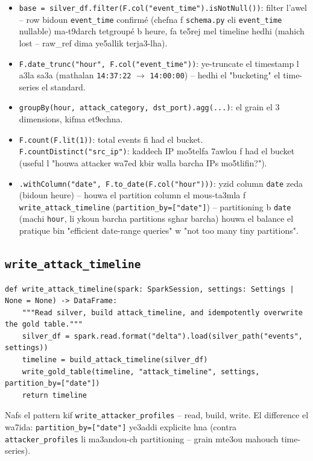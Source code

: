 \documentclass[11pt,a4paper]{report}
\DeclareRobustCommand{\code}[1]{\texttt{#1}}
\begin{document}
\begin{itemize}
  \item \code{base = silver\_df.filter(F.col("event\_time").isNotNull())}:
        filter l'awel -- row bidoun \code{event\_time} confirmé (chefna
        f \code{schema.py} eli \code{event\_time} nullable) ma-t9darch
        tetgroupé b heure, fa te5rej mel timeline hedhi (mahich lost --
        raw\_ref dima ye5allik terja3-lha).
  \item \code{F.date\_trunc("hour", F.col("event\_time"))}: ye-truncate
        el timestamp l a3la sa3a (mathalan \code{14:37:22} $\to$
        \code{14:00:00}) -- hedhi el "bucketing" el time-series el standard.
  \item \code{groupBy(hour, attack\_category, dst\_port).agg(...)}: el
        grain el 3 dimensions, kifma et9echna.
  \item \code{F.count(F.lit(1))}: total events fi had el bucket.
        \code{F.countDistinct("src\_ip")}: kaddech IP mo5telfa 7awlou
        f had el bucket (useful l "houwa attacker wa7ed kbir walla
        barcha IPs mo5tlifin?").
  \item \code{.withColumn("date", F.to\_date(F.col("hour")))}: yzid
        column \code{date} zeda (bidoun heure) -- houwa el partition
        column el mous-ta3mla f \code{write\_attack\_timeline}
        (\code{partition\_by=["date"]}) -- partitioning b \code{date}
        (machi \code{hour}, li ykoun barcha partitions sghar barcha)
        houwa el balance el pratique bin "efficient date-range queries"
        w "not too many tiny partitions".
\end{itemize}

\subsection{\code{write\_attack\_timeline}}

\begin{lstlisting}[style=pystyle]
def write_attack_timeline(spark: SparkSession, settings: Settings | None = None) -> DataFrame:
    """Read silver, build attack_timeline, and idempotently overwrite the gold table."""
    silver_df = spark.read.format("delta").load(silver_path("events", settings))
    timeline = build_attack_timeline(silver_df)
    write_gold_table(timeline, "attack_timeline", settings, partition_by=["date"])
    return timeline
\end{lstlisting}

Nafs el pattern kif \code{write\_attacker\_profiles} -- read, build,
write. El difference el wa7ida: \code{partition\_by=["date"]} ye3addi
explicite hna (contra \code{attacker\_profiles} li ma3andou-ch partitioning
-- grain mte3ou mahouch time-series).
\end{document}
